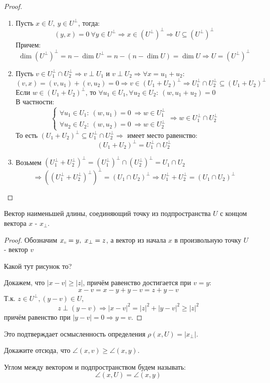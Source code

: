 \begin{proof}\tab
    \begin{enumerate}
        \item Пусть $x\in U,\ y\in U^\perp$, тогда: 
        $$(y,x)=0\ \forall y\in U^\perp \Rightarrow x\in (U^\perp)^\perp \Longrightarrow  U\subseteq (U^\perp)^\perp$$ 
        Причем: 
        $$\dim{(U^\perp)^\perp}=n-\dim{U^\perp}=n-(n-\dim{U})=\dim{U}\Longrightarrow  U=(U^\perp)^\perp$$

        \item Пусть $v\in U_1^\perp\cap U_2^\perp \Longrightarrow  v\perp U_1$ и $v\perp U_2 \Longrightarrow  \forall x=u_1+u_2$:
        $$(v,x)=(v,u_1)+(v,u_2)=0 \Longrightarrow  v\in (U_1+U_2)^\perp \Longrightarrow  U_1^\perp \cap U_2^\perp \subseteq (U_1+U_2)^\perp$$
        Если $w\in (U_1+U_2)^\perp$, то $\forall u_1\in U_1, \forall u_2\in U_2 :\ (w, u_1+u_2)=0$\\
        В частности: 
        $$\begin{cases}
            \forall u_1\in U_1: \ (w, u_1)=0 \ \Longrightarrow  w\in U_1^\perp\\
            \forall u_2\in U_2: \ (w, u_2)=0 \ \Longrightarrow  w\in U_2^\perp
        \end{cases} \Longrightarrow  w\in U_1^\perp\cap U_2^\perp$$
        То есть $(U_1+U_2)^\perp \subseteq U_1^\perp \cap U_2^\perp \Longrightarrow $ имеет место равенство:
        $$(U_1+U_2)^\perp=U_1^\perp\cap U_2^\perp$$

        \item Возьмем $(U_1^\perp+U_2^\perp)^\perp=(U_1^\perp)^\perp \cap (U_2^\perp)^\perp=U_1 \cap U_2$
        $$\Longrightarrow  ((U_1^\perp+U_2^\perp)^\perp)^\perp=(U_1\cap U_2)^\perp \Longrightarrow  U_1^\perp+U_2^\perp=(U_1 \cap U_2)^\perp$$
    \end{enumerate}
\end{proof}
\begin{subtheorem}
    Вектор наименьшей длины, соединяющий точку из подпространства $U$ с концом вектора $x$ - $x_{\perp}$. 
\end{subtheorem}
\begin{proof}
    Обозначим $x_{\shortparallel} = y, \ x_{\perp} = z$, а вектор из начала $x$ в произвольную точку $U$ - вектор $v$
    \begin{center}
        Какой тут рисунок то?
    \end{center}
    Докажем, что $|x-v|\geqslant |z|$, причём равенство достигается при $v = y$:
    $$x - v = x - y + y - v = z + y - v$$
    Т.к. $z \in U^{\perp}, (y - v) \in U$,
    $$z \perp (y-v) \Longrightarrow |x-v|^2 = |z|^2 + |y-v|^2 \geqslant |z|^2$$
    причём равенство при $|y - v| = 0 \Longrightarrow y = v$.
\end{proof}
Это подтверждает осмысленность определения $\rho(x, U) = |x_{\perp}|$.
\begin{exercise}
    Докажите отсюда, что $\angle(x, v) \geqslant \angle(x, y)$.
\end{exercise}
\begin{definition}
    Углом между вектором и подпространством будем называть: 
    $$\angle(x, U) = \angle(x, y)$$
\end{definition}

